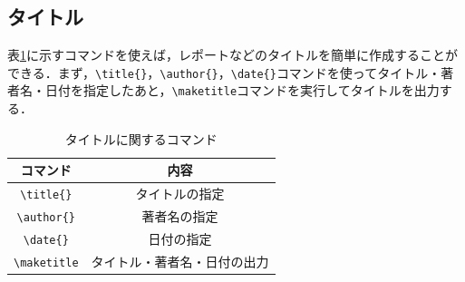 \subsection{タイトル}

表\ref{table:title}に示すコマンドを使えば，レポートなどのタイトルを簡単に作成することができる．まず，\verb|\title{}|，\verb|\author{}|，\verb|\date{}|コマンドを使ってタイトル・著者名・日付を指定したあと，\verb|\maketitle|コマンドを実行してタイトルを出力する．

\begin{table}[h]
    \caption{タイトルに関するコマンド}
    \label{table:title}
    \centering
    \begin{tabular}{c|c}
        コマンド & 内容　\\ \hline
        \verb|\title{}| & タイトルの指定 \\
        \verb|\author{}| & 著者名の指定 \\
        \verb|\date{}| & 日付の指定 \\
        \verb|\maketitle| & タイトル・著者名・日付の出力
    \end{tabular}
\end{table}

